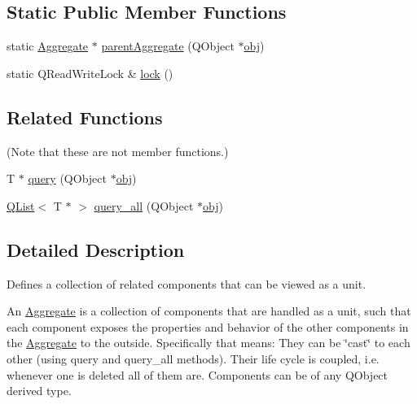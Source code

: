 \subsection*{Static Public Member Functions}
\begin{DoxyCompactItemize}
\item 
static \hyperlink{class_aggregation_1_1_aggregate}{Aggregate} $\ast$ \hyperlink{class_aggregation_1_1_aggregate_a0aa7a223205e78e49b6294bb0d165fc8}{parent\-Aggregate} (Q\-Object $\ast$\hyperlink{glext_8h_a0c0d4701a6c89f4f7f0640715d27ab26}{obj})
\item 
static Q\-Read\-Write\-Lock \& \hyperlink{class_aggregation_1_1_aggregate_add1e8a0af97e3413dbabb4410a46593c}{lock} ()
\end{DoxyCompactItemize}
\subsection*{Related Functions}
(Note that these are not member functions.) \begin{DoxyCompactItemize}
\item 
T $\ast$ \hyperlink{class_aggregation_1_1_aggregate_aa1790a8adba80f3a75ddb6e1a73c5246}{query} (Q\-Object $\ast$\hyperlink{glext_8h_a0c0d4701a6c89f4f7f0640715d27ab26}{obj})
\item 
\hyperlink{class_q_list}{Q\-List}$<$ T $\ast$ $>$ \hyperlink{class_aggregation_1_1_aggregate_a0528ea547017028ab58e315f88b58aa1}{query\-\_\-all} (Q\-Object $\ast$\hyperlink{glext_8h_a0c0d4701a6c89f4f7f0640715d27ab26}{obj})
\end{DoxyCompactItemize}


\subsection{Detailed Description}
Defines a collection of related components that can be viewed as a unit. 

An \hyperlink{class_aggregation_1_1_aggregate}{Aggregate} is a collection of components that are handled as a unit, such that each component exposes the properties and behavior of the other components in the \hyperlink{class_aggregation_1_1_aggregate}{Aggregate} to the outside. Specifically that means\-:   They can be \char`\"{}cast\char`\"{} to each other (using query and query\-\_\-all methods).  Their life cycle is coupled, i.\-e. whenever one is deleted all of them are.  Components can be of any Q\-Object derived type.

